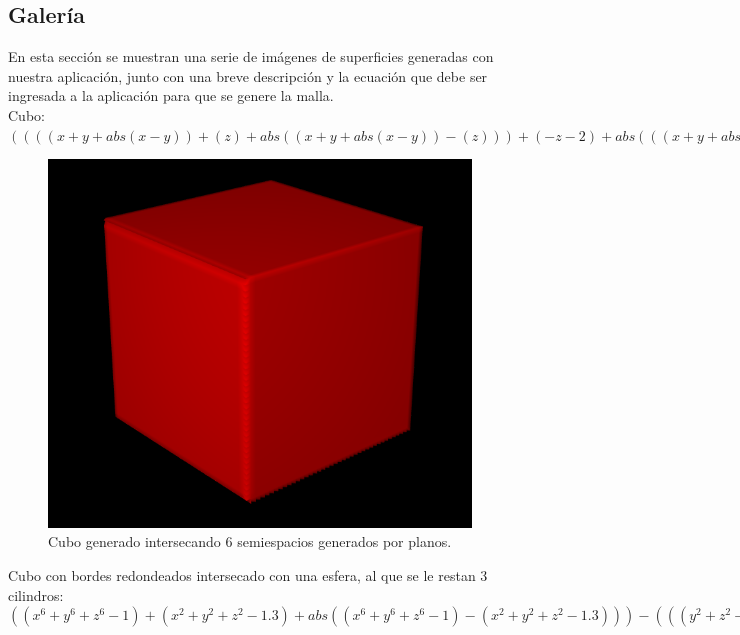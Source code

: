 \documentclass[12pt]{article}
\begin{document}
\clearpage
\subsection{Galería}
\noindent En esta sección se muestran una serie de imágenes de superficies generadas con nuestra aplicación, junto con una breve descripción y la ecuación que debe ser ingresada a la aplicación para que se genere la malla.
\\Cubo: $((((x+y+abs(x-y))+(z)+ abs((x+y+abs(x-y))-(z)))+ (-z-2)+abs(((x+y+abs (x-y))+(z)+ abs((x+y+abs(x-y))-(z))) -(-z-2)))+(-x-2)+ abs((((x+y+ abs(x-y))+(z)+ abs((x+y+abs (x-y)) -(z)))+(-z-2) +abs(((x+y+abs(x-y))+(z)+ abs((x+y+ abs(x-y)) -(z)))- (-z-2)))- (-x-2))) + (-y-2) +abs((((( x+y + abs(x-y))+(z)+ abs((x+ y+abs(x-y))-(z)))+(-z-2)+ abs(((x+ y+ abs(x-y))+ (z)+abs((x+y+abs (x-y))-(z)))-(-z-2)))+ (-x-2) +abs((((x+y+abs(x-y))+(z)+ abs((x+y+ abs(x-y))-(z)))+(-z-2)+abs(((x+y+abs(x-y))+(z)+ abs((x+y+abs (x-y))-(z)))-(-z-2)))-(-x-2)))-(-y-2))$
\begin{figure}[h!]
\includegraphics[width=0.7\linewidth,center]{g1.png}
\caption{Cubo generado intersecando 6 semiespacios generados por planos.}
\end{figure}
\clearpage
Cubo con bordes redondeados intersecado con una esfera, al que se le restan 3 cilindros: $((x^6+y^6+z^6-1) +(x^2+y^2+z^2-1.3) +abs((x^6+y^6+z^6-1) -(x^2+y^2+z^2-1.3 ))) -(((y^2+z^2-.5) +(x^2+z^2-.5) -abs((y^2+z^2-.5)-(x^2+z^2-.5))) +(x^2+y^2-.5) -abs(((y^2+z^2-.5)+ (x^2+z^2-.5) - abs ((y^2+z^2-.5) - (x^2+z^2-.5))) -(x^2+y^2-.5))) + abs(((x^6+y^6+z^6-1) +(x^2+y^2+z^2-1.3) + abs((x^6+y^6+z^6-1) -(x^2+y^2+z^2-1.3))) +(((y^2+z^2-.5) +(x^2+z^2-.5)-abs((y^2+z^2-.5)-(x^2+z^2-.5)))+(x^2+y^2-.5)-abs(((y^2+z^2-.5)+(x^2+z^2-.5)-abs((y^2+z^2-.5)-(x^2+z^2-.5)))-(x^2+y^2-.5))))$\\ 
\end{document}
